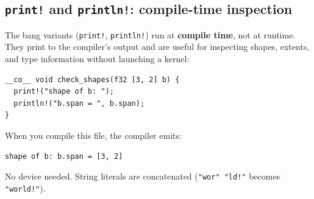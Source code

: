 \subsection*{\texttt{print!} and \texttt{println!}: compile-time inspection}

The bang variants (\texttt{print!}, \texttt{println!}) run at \textbf{compile time}, not at runtime. They print to the compiler's output and are useful for inspecting shapes, extents, and type information without launching a kernel:

\begin{lstlisting}[language=croqtile,caption={A compile-time shape print}]
__co__ void check_shapes(f32 [3, 2] b) {
  print!("shape of b: ");
  println!("b.span = ", b.span);
}
\end{lstlisting}

When you compile this file, the compiler emits:

\begin{lstlisting}[language=croqtile,caption={The printed shape}]
shape of b: b.span = [3, 2]
\end{lstlisting}

No device needed. String literals are concatenated (\texttt{"wor" "ld!"} becomes \texttt{"world!"}).
